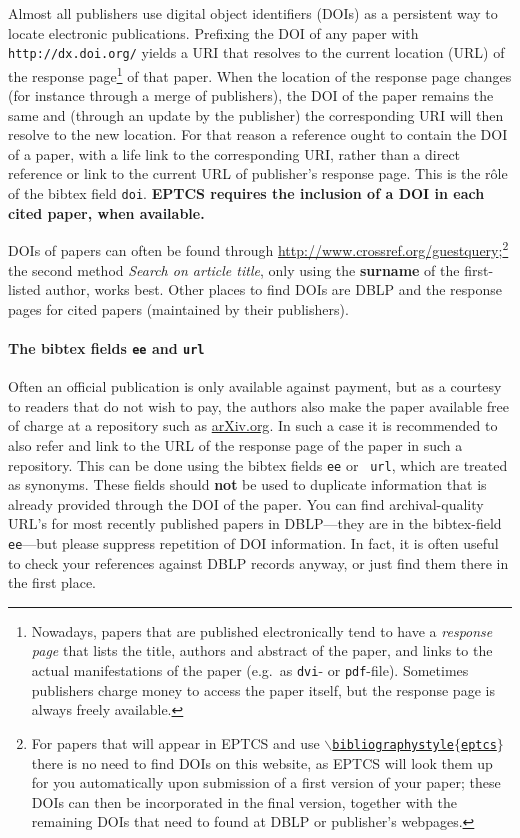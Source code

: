\documentclass[submission,copyright,creativecommons]{eptcs}
\begin{document}
Almost all publishers use digital object identifiers (DOIs) as a
persistent way to locate electronic publications. Prefixing the DOI of
any paper with {\tt http://dx.doi.org/} yields a URI that resolves to the
current location (URL) of the response page\footnote{Nowadays, papers
  that are published electronically tend
  to have a \emph{response page} that lists the title, authors and
  abstract of the paper, and links to the actual manifestations of
  the paper (e.g.\ as {\tt dvi}- or {\tt pdf}-file). Sometimes
  publishers charge money to access the paper itself, but the response
  page is always freely available.}
of that paper. When the location of the response page changes (for
instance through a merge of publishers), the DOI of the paper remains
the same and (through an update by the publisher) the corresponding
URI will then resolve to the new location. For that reason a reference
ought to contain the DOI of a paper, with a life link to the corresponding
URI, rather than a direct reference or link to the current URL of
publisher's response page. This is the r\^ole of the bibtex field {\tt doi}.
{\bf EPTCS requires the inclusion of a DOI in each cited paper, when available.}

DOIs of papers can often be found through
\url{http://www.crossref.org/guestquery};\footnote{For papers that will appear
  in EPTCS and use \href{http://eptcs.web.cse.unsw.edu.au/eptcs.bst}
  {\tt $\backslash$bibliographystyle$\{$eptcs$\}$} there is no need to
  find DOIs on this website, as EPTCS will look them up for you
  automatically upon submission of a first version of your paper;
  these DOIs can then be incorporated in the final version, together
  with the remaining DOIs that need to found at DBLP or publisher's webpages.}
the second method {\it Search on article title}, only using the {\bf
surname} of the first-listed author, works best.  
Other places to find DOIs are DBLP and the response pages for cited
papers (maintained by their publishers).

\paragraph{The bibtex fields {\tt ee} and {\tt url}}

Often an official publication is only available against payment, but
as a courtesy to readers that do not wish to pay, the authors also
make the paper available free of charge at a repository such as
\url{arXiv.org}. In such a case it is recommended to also refer and
link to the URL of the response page of the paper in such a
repository.  This can be done using the bibtex fields {\tt ee} or {\tt
url}, which are treated as synonyms.  These fields should \textbf{not} be used
to duplicate information that is already provided through the DOI of
the paper.
You can find archival-quality URL's for most recently published papers
in DBLP---they are in the bibtex-field {\tt ee}---but please suppress
repetition of DOI information. In fact, it is often
useful to check your references against DBLP records anyway, or just find
them there in the first place.
\end{document}
